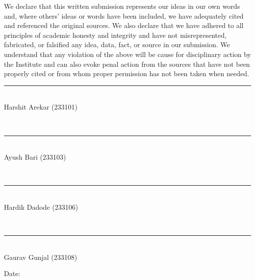 \documentclass[12pt,a4paper,oneside]{report}
\newcommand{\frontheading}[1]{%
  \begin{center}\vspace*{0.2cm}{\Large\bfseries #1}\end{center}\vspace{0.8cm}}
\newcommand{\signatureline}[1]{%
  \begin{minipage}[t]{0.42\textwidth}\centering
  \vspace{1.4cm}\rule{0.85\linewidth}{0.4pt}\\[-0.1em]#1
  \end{minipage}}
\begin{document}
\clearpage
\frontheading{Declaration}
\justifying
We declare that this written submission represents our ideas in our own words
and, where others' ideas or words have been included, we have adequately cited
and referenced the original sources. We also declare that we have adhered to
all principles of academic honesty and integrity and have not misrepresented,
fabricated, or falsified any idea, data, fact, or source in our submission. We
understand that any violation of the above will be cause for disciplinary
action by the Institute and can also evoke penal action from the sources that
have not been properly cited or from whom proper permission has not been taken
when needed.

\vspace{2cm}
\begin{flushright}
\signatureline{Harshit Arekar (233101)}\\[0.1cm]
\signatureline{Ayush Bari (233103)}\\[0.1cm]
\signatureline{Hardik Dadode (233106)}\\[0.1cm]
\signatureline{Gaurav Gunjal (233108)}
\end{flushright}
\vspace{2cm}
\noindent Date:
\end{document}
